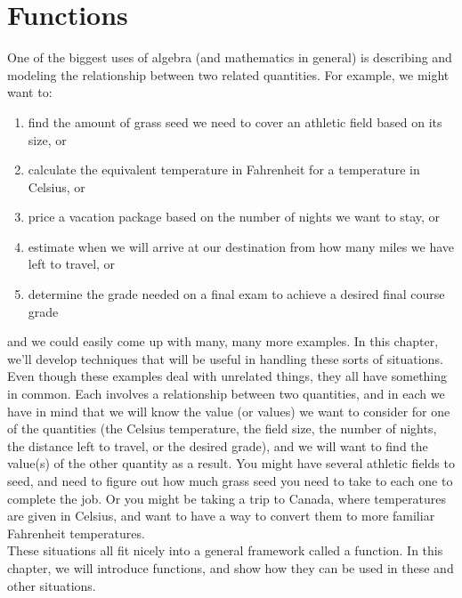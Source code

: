 %
%

\section{Functions}
\label{Functions}

One of the biggest uses of algebra (and mathematics in general) is describing and modeling the relationship between two related quantities. For example, we might want to:

\begin{enumerate}[label=$\circ$]
	\item find the amount of grass seed we need to cover an athletic field based on its size, or
	\item calculate the equivalent temperature in Fahrenheit for a temperature in Celsius, or
	\item price a vacation package based on the number of nights we want to stay, or
	\item estimate when we will arrive at our destination from how many miles we have left to travel, or
	\item determine the grade needed on a final exam to achieve a desired final course grade
\end{enumerate}

and we could easily come up with many, many more examples. In this chapter, we’ll develop techniques that will be useful in handling these sorts of situations.\\

Even though these examples deal with unrelated things, they all have something in common. Each involves a relationship between two quantities, and in each we have in mind that we will know the value (or values) we want to consider for one of the quantities (the Celsius temperature, the field size, the number of nights, the distance left to travel, or the desired grade), and we will want to find the value(s) of the other quantity as a result. You might have several athletic fields to seed, and need to figure out how much grass seed you need to take to each one to complete the job. Or you might be taking a trip to Canada, where temperatures are given in Celsius, and want to have a way to convert them to more familiar Fahrenheit temperatures.\\

These situations all fit nicely into a general framework called a function. In this chapter, we will introduce functions, and show how they can be used in these and other situations.

